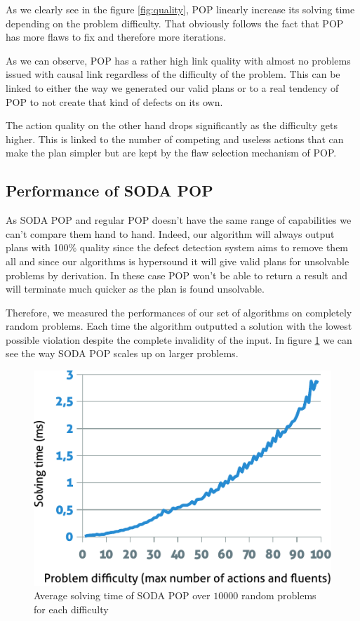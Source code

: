 \documentclass[]{article}
\begin{document}
As we clearly see in the figure \ref{fig:quality}, POP linearly increase
its solving time depending on the problem difficulty. That obviously
follows the fact that POP has more flaws to fix and therefore more
iterations.

As we can observe, POP has a rather high link quality with almost no
problems issued with causal link regardless of the difficulty of the
problem. This can be linked to either the way we generated our valid
plans or to a real tendency of POP to not create that kind of defects on
its own.

The action quality on the other hand drops significantly as the
difficulty gets higher. This is linked to the number of competing and
useless actions that can make the plan simpler but are kept by the flaw
selection mechanism of POP.

\subsection{Performance of SODA POP}\label{performance-of-soda-pop}

As SODA POP and regular POP doesn't have the same range of capabilities
we can't compare them hand to hand. Indeed, our algorithm will always
output plans with 100\% quality since the defect detection system aims
to remove them all and since our algorithms is hypersound it will give
valid plans for unsolvable problems by derivation. In these case POP
won't be able to return a result and will terminate much quicker as the
plan is found unsolvable.

Therefore, we measured the performances of our set of algorithms on
completely random problems. Each time the algorithm outputted a solution
with the lowest possible violation despite the complete invalidity of
the input. In figure \ref{fig:performance} we can see the way SODA POP
scales up on larger problems.

\begin{figure}[htbp]
\centering
\includegraphics{graphics/performance.pdf}
\caption{Average solving time of SODA POP over \(10 000\) random
problems for each difficulty\label{fig:performance}}
\end{figure}
\end{document}
